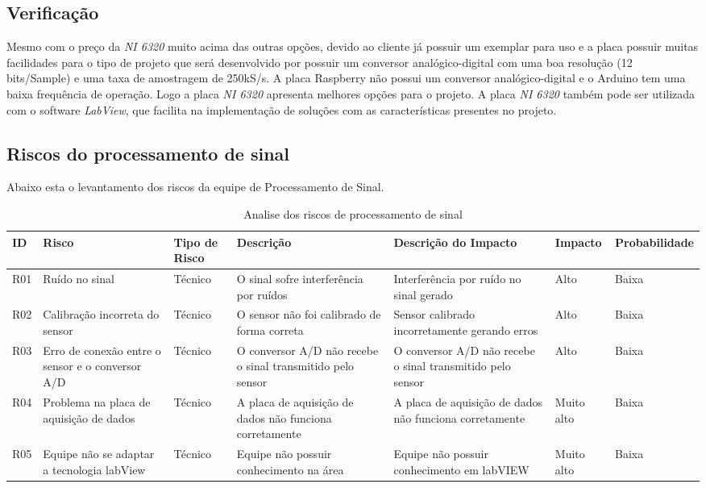 \subsection{Verificação}

Mesmo com o preço da \textit{NI 6320} muito acima das outras opções, devido ao cliente já possuir um exemplar para uso e a placa possuir muitas facilidades para o tipo de projeto que será desenvolvido por possuir um conversor analógico-digital com uma boa resolução (12 bits/Sample) e uma taxa de amostragem de 250kS/s. A placa Raspberry não possui um conversor analógico-digital e o Arduino tem uma baixa frequência de operação. Logo a placa \textit{NI 6320} apresenta melhores opções para o projeto.
A placa \textit{NI 6320} também pode ser utilizada com o software \textit{LabView}, que facilita na implementação de soluções com as características presentes no projeto.

\subsection{Riscos do processamento de sinal}
Abaixo esta o levantamento dos riscos da equipe de Processamento de Sinal.

\begin{table}
    \centering
    \begin{tabular}{|p{1cm}|p{2cm}|p{2cm}|p{2cm}|p{2cm}|p{1.7cm}|p{2.9cm}|}
    \hline
    \textbf{ID}  & \textbf{Risco} & \textbf{Tipo de Risco} & \textbf{Descrição} & \textbf{Descrição do Impacto} & \textbf{Impacto} & \textbf{Probabilidade} \\ \hline
    R01 & Ruído no sinal & Técnico & O sinal sofre interferência por ruídos & Interferência por ruído no sinal gerado & Alto & Baixa \\ \hline
    R02 & Calibração incorreta do sensor & Técnico & O sensor não foi calibrado de forma correta & Sensor calibrado incorretamente gerando erros & Alto & Baixa \\ \hline 
    R03 &Erro de conexão entre o sensor e o conversor A/D &Técnico &O conversor A/D não recebe o sinal  transmitido pelo sensor &O conversor A/D não recebe o sinal  transmitido pelo sensor &Alto &Baixa \\ \hline
    R04 &Problema na placa de aquisição de dados &Técnico &A placa de aquisição de dados não funciona corretamente &A placa de aquisição de dados não funciona corretamente &Muito alto &Baixa \\ \hline
    R05 &Equipe não se adaptar a tecnologia labView &Técnico &Equipe não possuir conhecimento na área &Equipe não possuir conhecimento em labVIEW &Muito alto &Baixa \\ \hline
\end{tabular}
    \caption{Analise dos riscos de processamento de sinal}
    \end{table}

